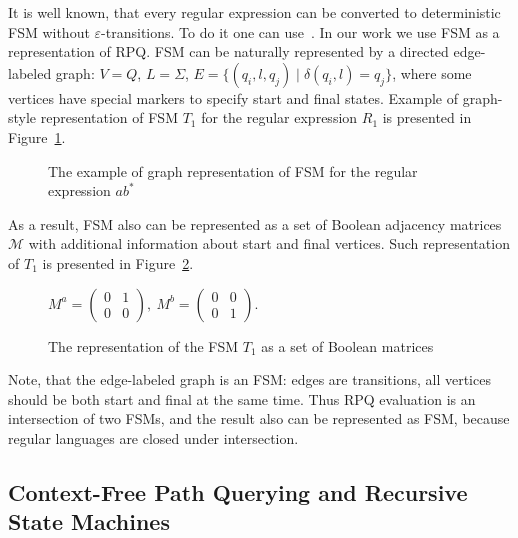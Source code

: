 It is well known, that every regular expression can be converted to deterministic FSM without $\varepsilon$-transitions.
To do it one can use~\cite{automata:theory:10.5555/1177300}.
In our work we use FSM as a representation of RPQ. 
FSM can be naturally represented by a directed edge-labeled graph: $V = Q$, $L = \Sigma$, $E = \{(q_i,l,q_j) \mid \delta(q_i,l) = q_j\}$, where some vertices have special markers to specify start and final states. Example of graph-style representation of FSM $T_1$ for the regular expression $R_1$ is presented in Figure~\ref{fig:example_fsm}.

\begin{figure}[h]
    \centering        
    \caption{The example of graph representation of FSM for the regular expression $ab^*$}
    \label{fig:example_fsm}
\end{figure}

As a result, FSM also can be represented as a set of Boolean adjacency matrices $\mathcal{M}$ with additional information about start and final vertices. Such representation of $T_1$ is presented in Figure~\ref{fig:boolean_decomposition_of_fsm}.
\begin{figure}[h]
    \centering
$
M^a =
\begin{pmatrix}
0&1 \\
0&0
\end{pmatrix},~
M^b =
\begin{pmatrix}
0&0 \\
0&1
\end{pmatrix}.
$ 
\caption{The representation of the FSM $T_1$ as a set of Boolean matrices}
\label{fig:boolean_decomposition_of_fsm}
\end{figure}

Note, that the edge-labeled graph is an FSM: edges are transitions, all vertices should be both start and final at the same time.
Thus RPQ evaluation is an intersection of two FSMs, and the result also can be represented as FSM, because regular languages are closed under intersection.

\subsection{Context-Free Path Querying and Recursive State Machines}


